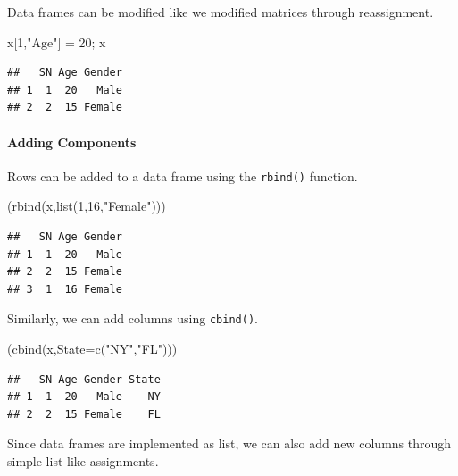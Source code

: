 \documentclass[
]{book}
\newenvironment{Shaded}{\begin{snugshade}}{\end{snugshade}}
\newcommand{\AttributeTok}[1]{\textcolor[rgb]{0.77,0.63,0.00}{#1}}
\newcommand{\DecValTok}[1]{\textcolor[rgb]{0.00,0.00,0.81}{#1}}
\newcommand{\FunctionTok}[1]{\textcolor[rgb]{0.00,0.00,0.00}{#1}}
\newcommand{\NormalTok}[1]{#1}
\newcommand{\OtherTok}[1]{\textcolor[rgb]{0.56,0.35,0.01}{#1}}
\newcommand{\StringTok}[1]{\textcolor[rgb]{0.31,0.60,0.02}{#1}}
\theoremstyle{definition}
\theoremstyle{definition}
\theoremstyle{definition}
\theoremstyle{definition}
\theoremstyle{remark}
\begin{document}
Data frames can be modified like we modified matrices through reassignment.

\begin{Shaded}
\begin{Highlighting}[]
\NormalTok{x[}\DecValTok{1}\NormalTok{,}\StringTok{"Age"}\NormalTok{] }\OtherTok{=} \DecValTok{20}\NormalTok{; x}
\end{Highlighting}
\end{Shaded}

\begin{verbatim}
##   SN Age Gender
## 1  1  20   Male
## 2  2  15 Female
\end{verbatim}

\hypertarget{adding-components}{%
\paragraph{Adding Components}\label{adding-components}}

Rows can be added to a data frame using the \texttt{rbind()} function.

\begin{Shaded}
\begin{Highlighting}[]
\NormalTok{(}\FunctionTok{rbind}\NormalTok{(x,}\FunctionTok{list}\NormalTok{(}\DecValTok{1}\NormalTok{,}\DecValTok{16}\NormalTok{,}\StringTok{"Female"}\NormalTok{)))}
\end{Highlighting}
\end{Shaded}

\begin{verbatim}
##   SN Age Gender
## 1  1  20   Male
## 2  2  15 Female
## 3  1  16 Female
\end{verbatim}

Similarly, we can add columns using \texttt{cbind()}.

\begin{Shaded}
\begin{Highlighting}[]
\NormalTok{(}\FunctionTok{cbind}\NormalTok{(x,}\AttributeTok{State=}\FunctionTok{c}\NormalTok{(}\StringTok{"NY"}\NormalTok{,}\StringTok{"FL"}\NormalTok{)))}
\end{Highlighting}
\end{Shaded}

\begin{verbatim}
##   SN Age Gender State
## 1  1  20   Male    NY
## 2  2  15 Female    FL
\end{verbatim}

Since data frames are implemented as list, we can also add new columns through simple list-like assignments.
\end{document}
